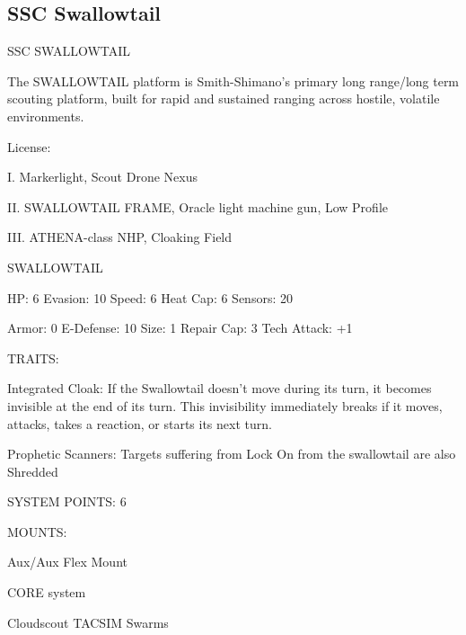 \subsection{SSC Swallowtail}

                                                           
                                          SSC SWALLOWTAIL  

The SWALLOWTAIL platform is Smith-Shimano’s primary long range/long term scouting platform,  
built for rapid and sustained ranging across hostile, volatile environments.   

                                                     License:
 

                                                                                                                


I. Markerlight, Scout Drone Nexus
 
II. SWALLOWTAIL FRAME,  Oracle light machine gun, Low Profile
 
III. ATHENA-class NHP, Cloaking Field
 

                                                SWALLOWTAIL 

  HP: 6           Evasion: 10                            Speed: 6            Heat Cap: 6         Sensors: 20 

  Armor: 0        E-Defense: 10                          Size: 1             Repair Cap: 3       Tech Attack:  
                                                                                                 +1 

                                                      TRAITS: 

  Integrated Cloak: If the Swallowtail doesn’t move during its turn, it becomes invisible at the end of its  
  turn. This invisibility immediately breaks if it moves, attacks, takes a reaction, or starts its next turn.
 
  Prophetic Scanners: Targets suffering from Lock On from the swallowtail are also Shredded 

                                               SYSTEM POINTS: 6 

                                                     MOUNTS: 

  Aux/Aux                                                 Flex Mount 

                                                   CORE system 

                                          Cloudscout TACSIM Swarms  


